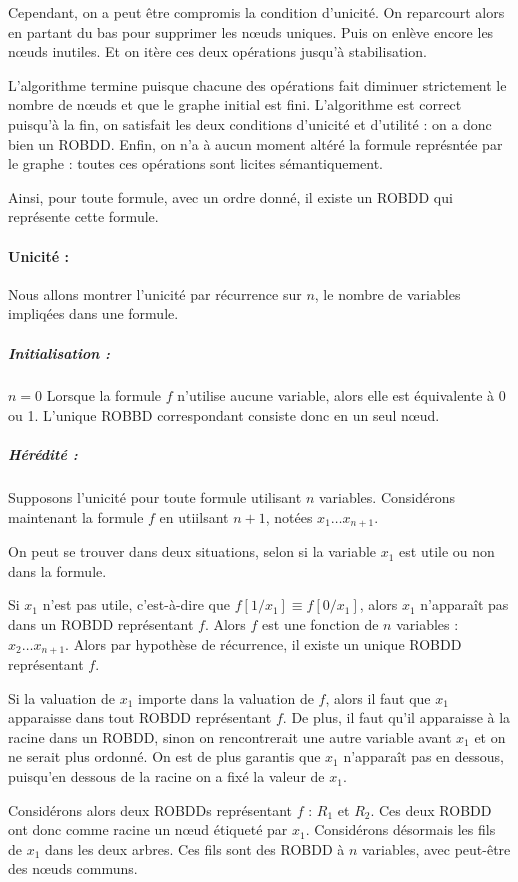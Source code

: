 \documentclass[12pt]{article}
\begin{document}
Cependant, on a peut être compromis la condition d'unicité. On reparcourt alors en partant du bas pour supprimer les n\oe uds uniques. Puis on enlève encore les n\oe uds inutiles. Et on itère ces deux opérations jusqu'à stabilisation. 

L'algorithme termine puisque chacune des opérations fait diminuer strictement le nombre de n\oe uds et que le graphe initial est fini.
L'algorithme est correct puisqu'à la fin, on satisfait les deux conditions d'unicité et d'utilité : on a donc bien un ROBDD. Enfin, on n'a à aucun moment altéré la formule représntée par le graphe : toutes ces opérations sont licites sémantiquement. %

Ainsi, pour toute formule, avec un ordre donné, il existe un ROBDD qui représente cette formule.

\paragraph{Unicité :} 
Nous allons montrer l'unicité par récurrence sur $n$, le nombre de variables impliqées dans une formule.

\subparagraph{Initialisation :}
$n = 0$ Lorsque la formule $f$ n'utilise aucune variable, alors elle est équivalente à 0 ou 1. L'unique ROBBD correspondant consiste donc en un seul n\oe ud.

\subparagraph{Hérédité :}
Supposons l'unicité pour toute formule utilisant $n$ variables. Considérons maintenant la formule $f$ en utiilsant $n+1$, notées $x_1\dots x_{n+1}$.

On peut se trouver dans deux situations, selon si la variable $x_1$ est utile ou non dans la formule.

Si $x_1$ n'est pas utile, c'est-à-dire que $f[1/x_1]\equiv f[0/x_1]$, alors $x_1$ n'apparaît pas dans un ROBDD représentant $f$. Alors $f$ est une fonction de $n$ variables : $x_2\dots x_{n+1}$. Alors par hypothèse de récurrence, il existe un unique ROBDD représentant $f$.

Si la valuation de $x_1$ importe dans la valuation de $f$, alors il faut que $x_1$ apparaisse dans tout ROBDD représentant $f$. De plus, il faut qu'il apparaisse à la racine dans un ROBDD, sinon on rencontrerait une autre variable avant $x_1$ et on ne serait plus ordonné. On est de plus garantis que $x_1$ n'apparaît pas en dessous, puisqu'en dessous de la racine on a fixé la valeur de $x_1$.

Considérons alors deux ROBDDs représentant $f$ : $R_1$ et $R_2$. Ces deux ROBDD ont donc comme racine un n\oe ud étiqueté par $x_1$. Considérons désormais les fils de $x_1$ dans les deux arbres. Ces fils sont des ROBDD à $n$ variables, avec peut-être des n\oe uds communs.
\end{document}
